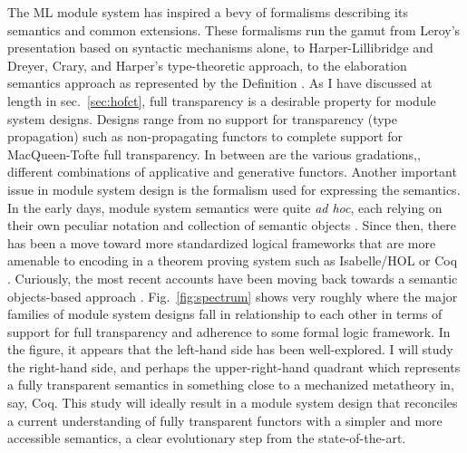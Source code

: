 The ML module system has inspired a bevy of formalisms describing its semantics and common extensions. These formalisms run the gamut from Leroy's presentation based on syntactic mechanisms alone, to Harper-Lillibridge \cite{lillibridge94} and Dreyer, Crary, and Harper's \cite{dhc03} type-theoretic approach, to the elaboration semantics approach as represented by the Definition \cite{mthm97}. As I have discussed at length in sec.~\ref{sec:hofct}, full transparency is a desirable property for module system designs. Designs range from no support for transparency (type propagation) such as non-propagating functors to complete support for MacQueen-Tofte full transparency. In between are the various gradations,\ie, different combinations of applicative and generative functors.  Another important issue in module system design is the formalism used for expressing the semantics. In the early days, module system semantics were quite {\it ad hoc}, each relying on their own peculiar notation and collection of semantic objects \cite{wirth:module,cacm:mesa,tofte92}. Since then, there has been a move toward more standardized logical frameworks that are more amenable to encoding in a theorem proving system such as Isabelle/HOL or Coq \cite{lillibridge94,dhc03}. Curiously, the most recent accounts have been moving back towards a semantic objects-based approach \cite{dreyer07,mixml}. Fig.~\ref{fig:spectrum} shows very roughly where the major families of module system designs fall in relationship to each other in terms of support for full transparency and adherence to some formal logic framework. In the figure, it appears that the left-hand side has been well-explored. I will study the right-hand side, and perhaps the upper-right-hand quadrant which represents a fully transparent semantics in something close to a mechanized metatheory in, say, Coq. This study will ideally result in a module system design that reconciles a current understanding of fully transparent functors with a simpler and more accessible semantics, a clear evolutionary step from the state-of-the-art. 

